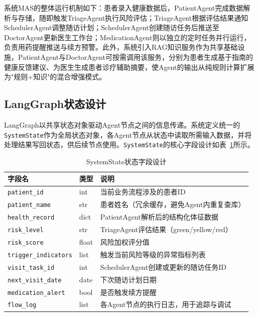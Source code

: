 系统MAS的整体运行机制如下：患者录入健康数据后，PatientAgent完成数据解析与存储，随即触发TriageAgent执行风险评估；TriageAgent根据评估结果通知SchedulerAgent调整随访计划；SchedulerAgent创建随访任务后推送至DoctorAgent更新医生工作台；MedicationAgent则以独立的定时任务并行运行，负责用药提醒推送与续方预警。此外，系统引入RAG知识服务作为共享基础设施，PatientAgent与DoctorAgent可按需调用该服务，分别为患者生成基于指南的健康反馈建议、为医生生成患者诊疗辅助摘要，使Agent的输出从纯规则计算扩展为"规则+知识"的混合增强模式。


\subsection{LangGraph状态设计}

LangGraph以共享状态对象驱动Agent节点之间的信息传递。系统定义统一的\texttt{SystemState}作为全局状态对象，各Agent节点从状态中读取所需输入数据，并将处理结果写回状态，供后续节点使用。\texttt{SystemState}的核心字段设计如表~\ref{tab:system-state}所示。

\begin{table}[H]
\centering
\caption{SystemState状态字段设计}
\label{tab:system-state}
\begin{tabularx}{\textwidth}{|l|l|X|}
\hline
\textbf{字段名} & \textbf{类型} & \textbf{说明} \\
\hline
\texttt{patient\_id} & int & 当前业务流程涉及的患者ID \\
\hline
\texttt{patient\_name} & str & 患者姓名（冗余缓存，避免Agent内重复查库） \\
\hline
\texttt{health\_record} & dict & PatientAgent解析后的结构化体征数据 \\
\hline
\texttt{risk\_level} & str & TriageAgent评估结果（green/yellow/red） \\
\hline
\texttt{risk\_score} & float & 风险加权评分值 \\
\hline
\texttt{trigger\_indicators} & list & 触发当前风险等级的异常指标列表 \\
\hline
\texttt{visit\_task\_id} & int & SchedulerAgent创建或更新的随访任务ID \\
\hline
\texttt{next\_visit\_date} & date & 下次随访计划日期 \\
\hline
\texttt{medication\_alert} & bool & 是否触发续方提醒 \\
\hline
\texttt{flow\_log} & list & 各Agent节点的执行日志，用于追踪与调试 \\
\hline
\end{tabularx}
\end{table}

